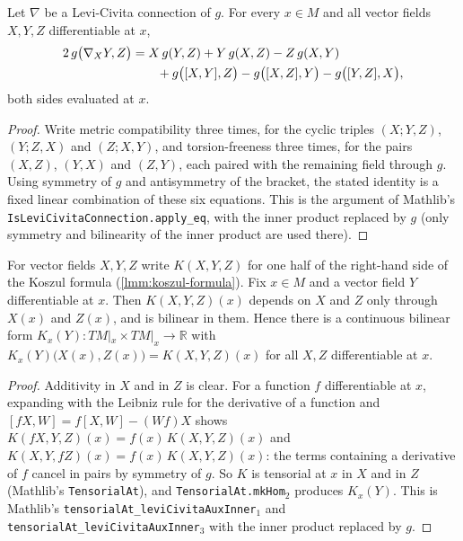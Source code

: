 \begin{lemma}
    \label{lmm:koszul-formula}
    \leanok
    Let $\nabla$ be a Levi-Civita connection of $g$. For every $x \in M$ and all vector fields $X, Y, Z$ differentiable at $x$,
    \begin{align}
        2\,g\big(\nabla_X Y, Z\big) &= X\,g(Y,Z) + Y\,g(X,Z) - Z\,g(X,Y) \notag \\
        &\qquad + g\big([X,Y],Z\big) - g\big([X,Z],Y\big) - g\big([Y,Z],X\big),
    \end{align}
    both sides evaluated at $x$.
\end{lemma}
\begin{proof}
    \leanok
    Write metric compatibility three times, for the cyclic triples $(X;Y,Z)$, $(Y;Z,X)$ and $(Z;X,Y)$, and torsion-freeness three times, for the pairs $(X,Z)$, $(Y,X)$ and $(Z,Y)$, each paired with the remaining field through $g$. Using symmetry of $g$ and antisymmetry of the bracket, the stated identity is a fixed linear combination of these six equations. This is the argument of Mathlib's \texttt{IsLeviCivitaConnection.apply\_eq}, with the inner product replaced by $g$ (only symmetry and bilinearity of the inner product are used there).
\end{proof}

\begin{lemma}
    \label{lmm:koszul-expression-tensorial}
    \leanok
    For vector fields $X, Y, Z$ write $K(X,Y,Z)$ for one half of the right-hand side of the Koszul formula (\ref{lmm:koszul-formula}). Fix $x \in M$ and a vector field $Y$ differentiable at $x$. Then $K(X,Y,Z)(x)$ depends on $X$ and $Z$ only through $X(x)$ and $Z(x)$, and is bilinear in them. Hence there is a continuous bilinear form $K_x(Y) : TM|_x \times TM|_x \to \mathbb{R}$ with $K_x(Y)\big(X(x), Z(x)\big) = K(X,Y,Z)(x)$ for all $X, Z$ differentiable at $x$.
\end{lemma}
\begin{proof}
    \leanok
    Additivity in $X$ and in $Z$ is clear. For a function $f$ differentiable at $x$, expanding with the Leibniz rule for the derivative of a function and $[fX, W] = f[X,W] - (Wf)X$ shows $K(fX, Y, Z)(x) = f(x)\,K(X,Y,Z)(x)$ and $K(X,Y,fZ)(x) = f(x)\,K(X,Y,Z)(x)$: the terms containing a derivative of $f$ cancel in pairs by symmetry of $g$. So $K$ is tensorial at $x$ in $X$ and in $Z$ (Mathlib's \texttt{TensorialAt}), and \texttt{TensorialAt.mkHom\ensuremath{_2}} produces $K_x(Y)$. This is Mathlib's \texttt{tensorialAt\_leviCivitaAuxInner\ensuremath{_1}} and \texttt{tensorialAt\_leviCivitaAuxInner\ensuremath{_3}} with the inner product replaced by $g$.
\end{proof}

